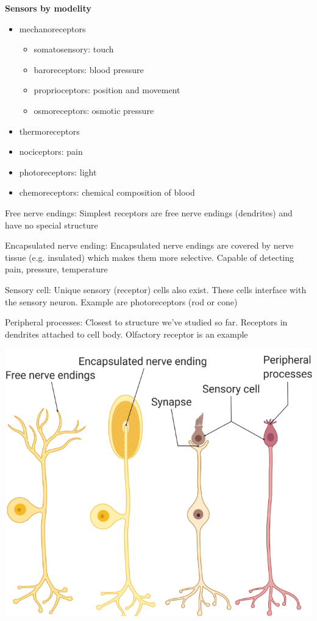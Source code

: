\documentclass[11pt,fleqn]{book}
\begin{document}
\textbf{Sensors by modelity}
\begin{itemize}
    \item mechanoreceptors
    \begin{itemize}
        \item somatosensory: touch
        \item baroreceptors: blood pressure
        \item proprioceptors: position and movement
        \item osmoreceptors: osmotic pressure
    \end{itemize}
    \item thermoreceptors
    \item nociceptors: pain
    \item photoreceptors: light
    \item chemoreceptors: chemical composition of blood
\end{itemize}
\begin{descriptions}
    \item[Free nerve endings:] Simplest receptors are free nerve endings (dendrites) and have no special structure
    \item[Encapsulated nerve ending:] Encapsulated nerve endings are covered by nerve tissue (e.g. insulated) which makes them more selective. Capable of detecting pain, pressure, temperature
    \item[Sensory cell:] Unique sensory (receptor) cells also exist. These cells interface with the sensory neuron. Example are photoreceptors (rod or cone) 
    \item[Peripheral processes:] Closest to structure we’ve studied so far. Receptors in dendrites attached to cell body. Olfactory receptor is an example 
\end{descriptions}
\begin{center}
    \includegraphics[width=0.65\linewidth]{Pictures/Screenshot 2024-03-06 193746.png}
\end{center}
\end{document}
